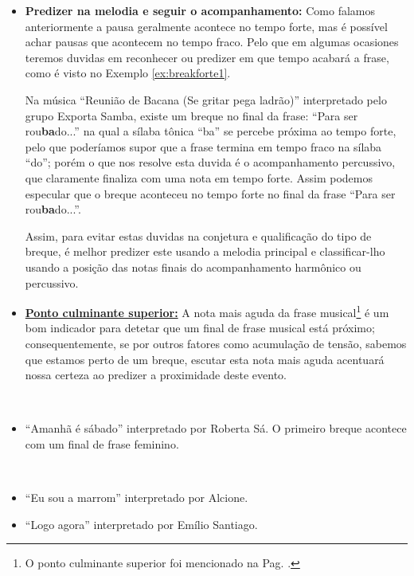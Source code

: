 \begin{itemize}
\item \textbf{Predizer na melodia e seguir o acompanhamento:}
Como falamos anteriormente a pausa geralmente acontece no tempo forte,
mas é possível achar pausas que acontecem no tempo fraco. 
Pelo que em algumas ocasiones teremos duvidas em reconhecer ou predizer em que tempo acabará a frase,
como é visto no Exemplo \ref{ex:breakforte1}.
\begin{example}
\label{ex:breakforte1}
Na música ``Reunião de Bacana (Se gritar pega ladrão)'' interpretado pelo grupo Exporta Samba,
existe um breque no final da frase: ``Para ser rou\textbf{ba}do...''
na qual a sílaba tônica ``ba'' se percebe próxima ao tempo forte, 
pelo que poderíamos supor que a frase termina em tempo fraco na sílaba ``do'';
porém o que nos resolve esta duvida é o acompanhamento percussivo, 
que claramente finaliza com uma nota em tempo forte.
Assim podemos especular que o breque aconteceu no tempo forte
no final da frase ``Para ser rou\textbf{ba}do...''.
\end{example}
Assim, para evitar estas duvidas na conjetura e qualificação do tipo de breque,
é melhor predizer este usando a melodia principal 
e classificar-lho usando a posição das notas finais do acompanhamento harmônico ou percussivo.
\item \hyperref[ref:PontoCulminanteSuperior]{\textbf{Ponto culminante superior:}} 
A nota mais aguda da frase musical\footnote{O 
ponto culminante superior foi mencionado na Pag. \pageref{ref:PontoCulminanteSuperior}.} 
é um bom indicador para detetar que um final de frase musical está próximo; 
consequentemente, se por outros fatores como acumulação de tensão,
sabemos que estamos perto de um breque, escutar esta nota mais aguda acentuará nossa certeza ao predizer 
a proximidade deste evento.


\end{itemize}



\begin{example}~
\label{ex:breakfeminino}
\begin{itemize}
\item ``Amanhã é sábado'' interpretado por Roberta Sá. 
O primeiro breque acontece com um final de frase feminino.
\end{itemize}
\end{example}

\begin{example}~
\label{ex:breaksincopados}
\begin{itemize}
\item ``Eu sou a marrom'' interpretado por Alcione.
\item ``Logo agora'' interpretado por Emílio Santiago.
\end{itemize}
\end{example}

